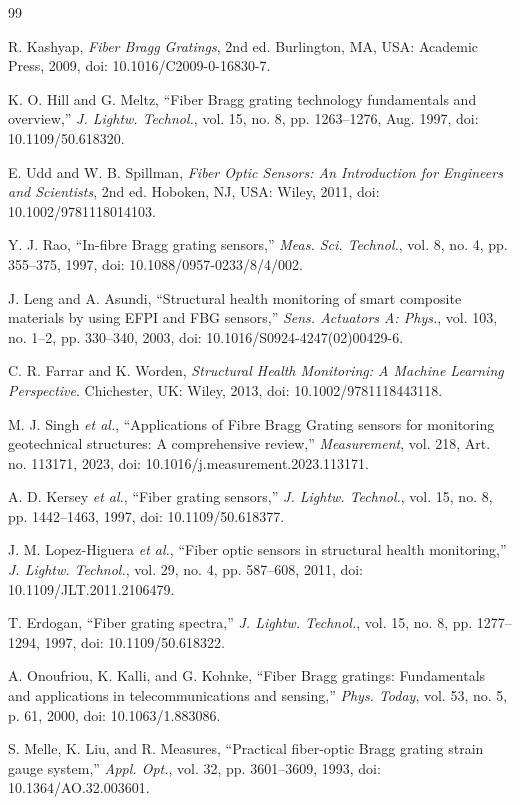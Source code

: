 \documentclass[journal,twoside,web]{ieeecolor}
\begin{document}
\begin{thebibliography}{99}

R. Kashyap, \emph{Fiber Bragg Gratings}, 2nd ed. Burlington, MA, USA:
Academic Press, 2009, doi: 10.1016/C2009-0-16830-7.

K. O. Hill and G. Meltz, ``Fiber Bragg grating technology fundamentals and overview,''
\emph{J. Lightw. Technol.}, vol. 15, no. 8, pp. 1263--1276, Aug. 1997,
doi: 10.1109/50.618320.

E. Udd and W. B. Spillman,
\emph{Fiber Optic Sensors: An Introduction for Engineers and Scientists},
2nd ed. Hoboken, NJ, USA: Wiley, 2011,
doi: 10.1002/9781118014103.

Y. J. Rao, ``In-fibre Bragg grating sensors,''
\emph{Meas. Sci. Technol.}, vol. 8, no. 4, pp. 355--375, 1997,
doi: 10.1088/0957-0233/8/4/002.

J. Leng and A. Asundi,
``Structural health monitoring of smart composite materials by using EFPI and FBG sensors,''
\emph{Sens. Actuators A: Phys.}, vol. 103, no. 1--2, pp. 330--340, 2003,
doi: 10.1016/S0924-4247(02)00429-6.

C. R. Farrar and K. Worden,
\emph{Structural Health Monitoring: A Machine Learning Perspective}.
Chichester, UK: Wiley, 2013,
doi: 10.1002/9781118443118.

M. J. Singh \emph{et al.},
``Applications of Fibre Bragg Grating sensors for monitoring geotechnical structures:
A comprehensive review,''
\emph{Measurement}, vol. 218, Art. no. 113171, 2023,
doi: 10.1016/j.measurement.2023.113171.

A. D. Kersey \emph{et al.},
``Fiber grating sensors,''
\emph{J. Lightw. Technol.}, vol. 15, no. 8, pp. 1442--1463, 1997,
doi: 10.1109/50.618377.

J. M. Lopez-Higuera \emph{et al.},
``Fiber optic sensors in structural health monitoring,''
\emph{J. Lightw. Technol.}, vol. 29, no. 4, pp. 587--608, 2011,
doi: 10.1109/JLT.2011.2106479.

T. Erdogan,
``Fiber grating spectra,''
\emph{J. Lightw. Technol.}, vol. 15, no. 8, pp. 1277--1294, 1997,
doi: 10.1109/50.618322.

A. Onoufriou, K. Kalli, and G. Kohnke,
``Fiber Bragg gratings: Fundamentals and applications in telecommunications and sensing,''
\emph{Phys. Today}, vol. 53, no. 5, p. 61, 2000,
doi: 10.1063/1.883086.

S. Melle, K. Liu, and R. Measures,
``Practical fiber-optic Bragg grating strain gauge system,''
\emph{Appl. Opt.}, vol. 32, pp. 3601--3609, 1993,
doi: 10.1364/AO.32.003601.


\end{thebibliography}
\end{document}
